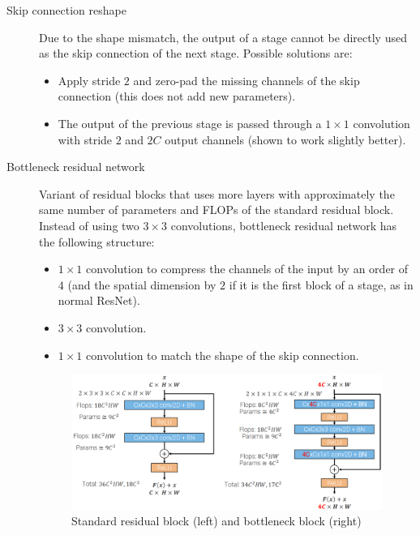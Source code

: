 \begin{description}
    \item[Skip connection reshape]
        Due to the shape mismatch, the output of a stage cannot be directly used as the skip connection of the next stage.
        Possible solutions are:
        \begin{itemize}
            \item Apply stride $2$ and zero-pad the missing channels of the skip connection (this does not add new parameters).
            \item The output of the previous stage is passed through a $1 \times 1$ convolution with stride $2$ and $2C$ output channels (shown to work slightly better).
        \end{itemize}

    \item[Bottleneck residual network] 
        Variant of residual blocks that uses more layers with approximately the same number of parameters and FLOPs of the standard residual block.
        Instead of using two $3 \times 3$ convolutions, bottleneck residual network has the following structure:
        \begin{itemize}
            \item $1 \times 1$ convolution to compress the channels of the input by an order of $4$ (and the spatial dimension by $2$ if it is the first block of a stage, as in normal ResNet).
            \item $3 \times 3$ convolution.
            \item $1 \times 1$ convolution to match the shape of the skip connection.
        \end{itemize}

        \begin{figure}[H]
            \centering
            \includegraphics[width=0.7\linewidth]{./img/bottleneck_block.png}
            \caption{Standard residual block (left) and bottleneck block (right)}
        \end{figure}
\end{description}

